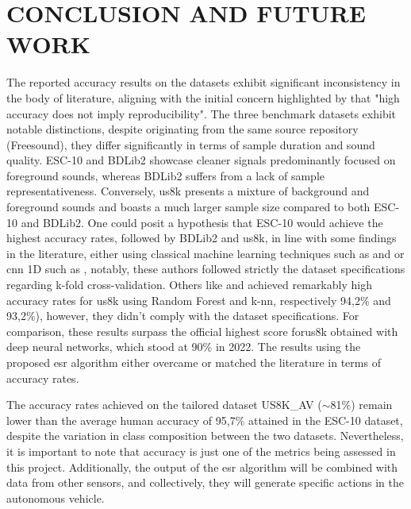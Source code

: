 \chapter{CONCLUSION AND FUTURE WORK}
\label{chp:conclusion}


The reported accuracy results on the datasets exhibit significant inconsistency in the body of literature, aligning with the initial concern highlighted by \textcite{Ho2020} that "high accuracy does not imply reproducibility". The three benchmark datasets exhibit notable distinctions, despite originating from the same source repository (Freesound), they differ significantly in terms of sample duration and sound quality. ESC-10 and BDLib2 showcase cleaner signals predominantly focused on foreground sounds, whereas BDLib2 suffers from a lack of sample representativeness. Conversely, \gls{us8k} presents a mixture of background and foreground sounds and boasts a much larger sample size compared to both ESC-10 and BDLib2. One could posit a hypothesis that ESC-10 would achieve the highest accuracy rates, followed by BDLib2 and \gls{us8k}, in line with some findings in the literature, either using classical machine learning techniques such as \cite{Silva2019} and \cite{Bountourakis2019} or \gls{cnn} 1D such as \cite{Vandendriessche2021}, notably, these authors followed strictly the dataset specifications regarding k-fold cross-validation. Others like \cite{Lhoest2021} and \cite{Luz2021} achieved remarkably high accuracy rates for \gls{us8k} using Random Forest and \gls{k-nn}, respectively 94,2\% and 93,2\%), however, they didn't comply with the dataset specifications. For comparison, these results surpass the official highest score for\gls{us8k} obtained with deep neural networks, which stood at 90\% in 2022. The results using the proposed \gls{esr} algorithm either overcame or matched the literature in terms of accuracy rates.


The accuracy rates achieved on the tailored dataset US8K\_AV ($\sim$81\%) remain lower than the average human accuracy of 95,7\% attained in the ESC-10 dataset, despite the variation in class composition between the two datasets. Nevertheless, it is important to note that accuracy is just one of the metrics being assessed in this project. Additionally, the output of the \gls{esr} algorithm will be combined with data from other sensors, and collectively, they will generate specific actions in the autonomous vehicle.

